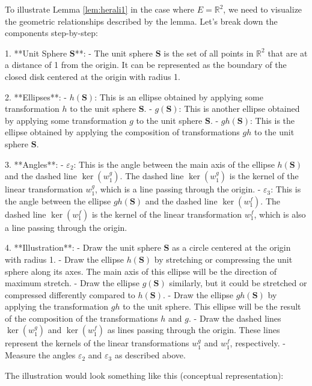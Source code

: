 To illustrate Lemma \ref{lem:herali1} in the case where \( E = \mathbb{R}^2 \), we need to visualize the geometric relationships described by the lemma. Let's break down the components step-by-step:

1. **Unit Sphere \(\mathbf{S}\)**:
   - The unit sphere \(\mathbf{S}\) is the set of all points in \(\mathbb{R}^2\) that are at a distance of 1 from the origin. It can be represented as the boundary of the closed disk centered at the origin with radius 1.

2. **Ellipses**:
   - \( h(\mathbf{S}) \): This is an ellipse obtained by applying some transformation \( h \) to the unit sphere \(\mathbf{S}\).
   - \( g(\mathbf{S}) \): This is another ellipse obtained by applying some transformation \( g \) to the unit sphere \(\mathbf{S}\).
   - \( gh(\mathbf{S}) \): This is the ellipse obtained by applying the composition of transformations \( gh \) to the unit sphere \(\mathbf{S}\).

3. **Angles**:
   - \(\varepsilon_2\): This is the angle between the main axis of the ellipse \( h(\mathbf{S}) \) and the dashed line \(\ker(w_1^g)\). The dashed line \(\ker(w_1^g)\) is the kernel of the linear transformation \( w_1^g \), which is a line passing through the origin.
   - \(\varepsilon_3\): This is the angle between the ellipse \( gh(\mathbf{S}) \) and the dashed line \(\ker(w^f_1)\). The dashed line \(\ker(w^f_1)\) is the kernel of the linear transformation \( w^f_1 \), which is also a line passing through the origin.

4. **Illustration**:
   - Draw the unit sphere \(\mathbf{S}\) as a circle centered at the origin with radius 1.
   - Draw the ellipse \( h(\mathbf{S}) \) by stretching or compressing the unit sphere along its axes. The main axis of this ellipse will be the direction of maximum stretch.
   - Draw the ellipse \( g(\mathbf{S}) \) similarly, but it could be stretched or compressed differently compared to \( h(\mathbf{S}) \).
   - Draw the ellipse \( gh(\mathbf{S}) \) by applying the transformation \( gh \) to the unit sphere. This ellipse will be the result of the composition of the transformations \( h \) and \( g \).
   - Draw the dashed lines \(\ker(w_1^g)\) and \(\ker(w^f_1)\) as lines passing through the origin. These lines represent the kernels of the linear transformations \( w_1^g \) and \( w^f_1 \), respectively.
   - Measure the angles \(\varepsilon_2\) and \(\varepsilon_3\) as described above.

The illustration would look something like this (conceptual representation):

